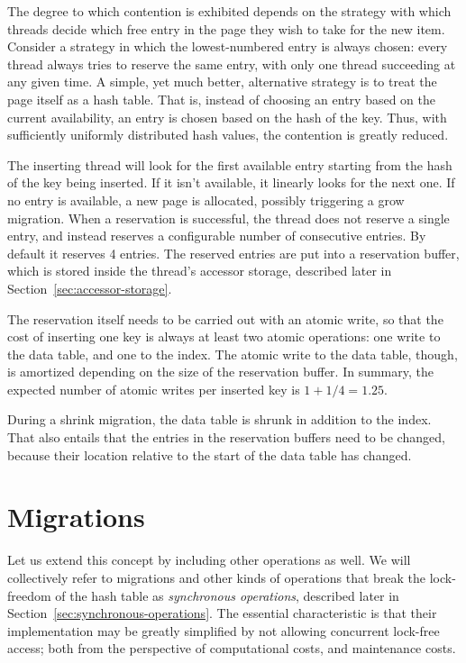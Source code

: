 The degree to which contention is exhibited depends on the strategy with which threads decide which free entry in the page they wish to take for the new item.
Consider a strategy in which the lowest-numbered entry is always chosen: every thread always tries to reserve the same entry, with only one thread succeeding at any given time.
A simple, yet much better, alternative strategy is to treat the page itself as a hash table.
That is, instead of choosing an entry based on the current availability, an entry is chosen based on the hash of the key.
Thus, with sufficiently uniformly distributed hash values, the contention is greatly reduced.

The inserting thread will look for the first available entry starting from the hash of the key being inserted.
If it isn't available, it linearly looks for the next one.
If no entry is available, a new page is allocated, possibly triggering a grow migration.
When a reservation is successful, the thread does not reserve a single entry, and instead reserves a configurable number of consecutive entries.
By default it reserves 4 entries.
The reserved entries are put into a reservation buffer, which is stored inside the thread's accessor storage, described later in Section~\ref{sec:accessor-storage}.

The reservation itself needs to be carried out with an atomic write, so that the cost of inserting one key is always at least two atomic operations: one write to the data table, and one to the index.
The atomic write to the data table, though, is amortized depending on the size of the reservation buffer.
In summary, the expected number of atomic writes per inserted key is $1 + 1/4 = 1.25$.

During a shrink migration, the data table is shrunk in addition to the index.
That also entails that the entries in the reservation buffers need to be changed, because their location relative to the start of the data table has changed.


\section{Migrations}\label{sec:migrations-design}


Let us extend this concept by including other operations as well.
We will collectively refer to migrations and other kinds of operations that break the lock-freedom of the hash table as \emph{synchronous operations}, described later in Section~\ref{sec:synchronous-operations}.
The essential characteristic is that their implementation may be greatly simplified by not allowing concurrent lock-free access; both from the perspective of computational costs, and maintenance costs.

